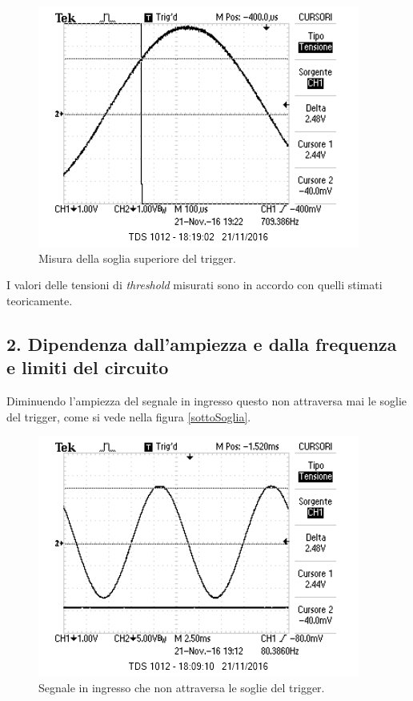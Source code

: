 \documentclass[10pt,a4paper]{article}
\begin{document}
\begin{figure}[h]
\centering
\includegraphics[scale=0.5]{immagini/FotoRicordoVth2.png}
\caption{Misura della soglia superiore del trigger.}
\label{sogliapiu}
\end{figure}

I valori delle tensioni di \emph{threshold} misurati sono in accordo con quelli stimati teoricamente.

\subsection*{2. Dipendenza dall'ampiezza e dalla frequenza e limiti del circuito}

Diminuendo l'ampiezza del segnale in ingresso questo non attraversa mai le soglie del trigger, come si vede nella figura \ref{sottoSoglia}.

\begin{figure}[h]
\centering
\includegraphics[scale=0.5]{immagini/sottoSogliaInferiore.png}
\caption{Segnale in ingresso che non attraversa le soglie del trigger.}
\label{sogliapiu}
\end{figure}
\end{document}
